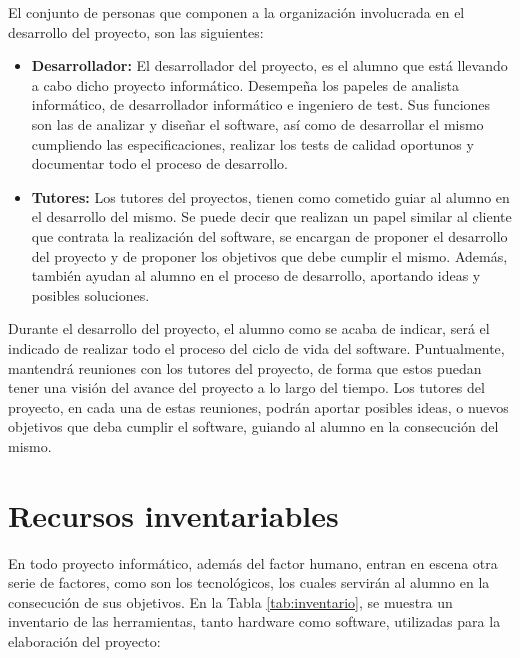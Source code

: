 El conjunto de personas que componen a la organización involucrada en el
desarrollo del proyecto, son las siguientes:
\begin{itemize}
    \item \textbf{Desarrollador:} El desarrollador del proyecto, es el alumno
           que está llevando a cabo dicho proyecto informático. Desempeña los
           papeles de analista informático, de desarrollador informático e
           ingeniero de test. Sus funciones son las de analizar y diseñar el
           software, así como de desarrollar el mismo cumpliendo las
           especificaciones, realizar los tests de calidad oportunos y
           documentar todo el proceso de desarrollo.
    \item \textbf{Tutores:} Los tutores del proyectos, tienen como cometido
           guiar al alumno en el desarrollo del mismo. Se puede decir que
           realizan un papel similar al cliente que contrata la realización del
           software, se encargan de proponer el desarrollo del proyecto y de
           proponer los objetivos que debe cumplir el mismo. Además, también
           ayudan al alumno en el proceso de desarrollo, aportando ideas y
           posibles soluciones.
\end{itemize}

Durante el desarrollo del proyecto, el alumno como se acaba de indicar, será el
indicado de realizar todo el proceso del ciclo de vida del software.
Puntualmente, mantendrá reuniones con los tutores del proyecto, de forma que
estos puedan tener una visión del avance del proyecto a lo largo del tiempo. Los
tutores del proyecto, en cada una de estas reuniones, podrán aportar posibles
ideas, o nuevos objetivos que deba cumplir el software, guiando al alumno en la
consecución del mismo.

\section{Recursos inventariables}

En todo proyecto informático, además del factor humano, entran en escena otra
serie de factores, como son los tecnológicos, los cuales servirán al alumno en
la consecución de sus objetivos. En la Tabla \ref{tab:inventario}, se muestra
un inventario de las herramientas, tanto hardware como software, utilizadas
para la elaboración del proyecto:

